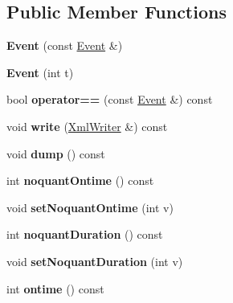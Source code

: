 \subsection*{Public Member Functions}
\begin{DoxyCompactItemize}
\item 
\mbox{\label{class_ms_1_1_event_ac540d5e149dc8f0670ce49d1a1bc4d98}} 
{\bfseries Event} (const \hyperlink{class_ms_1_1_event}{Event} \&)
\item 
\mbox{\label{class_ms_1_1_event_acc6bd4990c0842fd8d50abcd353f1919}} 
{\bfseries Event} (int t)
\item 
\mbox{\label{class_ms_1_1_event_af88bc0eb4edce2ab3d504726476e4601}} 
bool {\bfseries operator==} (const \hyperlink{class_ms_1_1_event}{Event} \&) const
\item 
\mbox{\label{class_ms_1_1_event_ac83612d55596b22ab7778ac9109c5da1}} 
void {\bfseries write} (\hyperlink{class_ms_1_1_xml_writer}{Xml\+Writer} \&) const
\item 
\mbox{\label{class_ms_1_1_event_a12dd19b0ef493fdfe2ce996e655f5f74}} 
void {\bfseries dump} () const
\item 
\mbox{\label{class_ms_1_1_event_a667b3df38886c453a4e9b6b2aa4634e8}} 
int {\bfseries noquant\+Ontime} () const
\item 
\mbox{\label{class_ms_1_1_event_ae182410a74f9e2e491bdaa73db654875}} 
void {\bfseries set\+Noquant\+Ontime} (int v)
\item 
\mbox{\label{class_ms_1_1_event_a7b89859c0129cc9aa19a002576678bd9}} 
int {\bfseries noquant\+Duration} () const
\item 
\mbox{\label{class_ms_1_1_event_a43c27fd7903f8ee402cd2330060a54e4}} 
void {\bfseries set\+Noquant\+Duration} (int v)
\item 
\mbox{\label{class_ms_1_1_event_a3799997f90941605ac4ef0fbf4f17f2f}} 
int {\bfseries ontime} () const
\item 

\end{DoxyCompactItemize}

